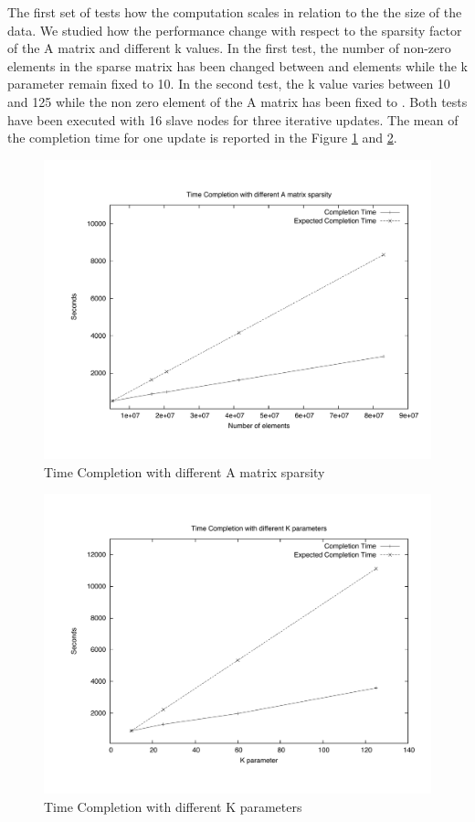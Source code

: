 The first set of tests how the computation scales in relation to the the size of the data. 
We studied how the performance change with respect to the sparsity factor of the A matrix and different k values. 
In the first test, the number of non-zero elements in the sparse matrix has been changed between  and  elements while the k parameter remain fixed to 10. 
In the second test, the k value varies between 10 and 125 while the non zero element of the A matrix has been fixed to .  Both tests have been executed with 16 slave nodes for three iterative updates. 
The mean of the completion time for one update is reported in the Figure \ref{DeltaVar}  and \ref{kVar}. 


\begin{figure}[th]
	\centerline{
		\mbox{\includegraphics[scale=0.48]{HadoopTest/PsFiles/DeltaVar.pdf}}
	}
	\caption{Time Completion with different A matrix sparsity} 
        \label{DeltaVar}
\end{figure}

\begin{figure}[th]
	\centerline{
		\mbox{\includegraphics[scale=0.48]{HadoopTest/PsFiles/kVar.pdf}}
	}
	\caption{Time Completion with different K parameters} 
        \label{kVar}
\end{figure}


